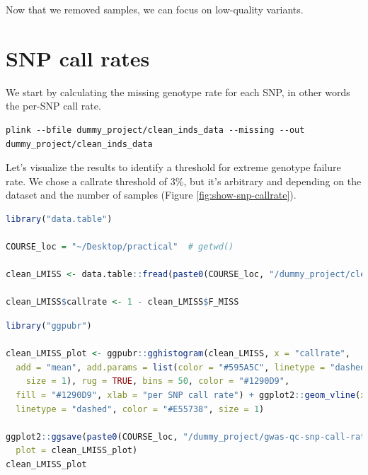 \documentclass[
]{book}
\begin{document}
Now that we removed samples, we can focus on low-quality variants.

\hypertarget{snp-call-rates}{%
\section{SNP call rates}\label{snp-call-rates}}

We start by calculating the missing genotype rate for each SNP, in other words the per-SNP call rate.

\begin{lstlisting}
plink --bfile dummy_project/clean_inds_data --missing --out dummy_project/clean_inds_data
\end{lstlisting}

Let's visualize the results to identify a threshold for extreme genotype failure rate. We chose a callrate threshold of 3\%, but it's arbitrary and depending on the dataset and the number of samples (Figure \ref{fig:show-snp-callrate}).

\begin{lstlisting}[language=R]
library("data.table")

COURSE_loc = "~/Desktop/practical"  # getwd()

clean_LMISS <- data.table::fread(paste0(COURSE_loc, "/dummy_project/clean_inds_data.lmiss"))

clean_LMISS$callrate <- 1 - clean_LMISS$F_MISS
\end{lstlisting}

\begin{lstlisting}[language=R]
library("ggpubr")

clean_LMISS_plot <- ggpubr::gghistogram(clean_LMISS, x = "callrate",
  add = "mean", add.params = list(color = "#595A5C", linetype = "dashed",
    size = 1), rug = TRUE, bins = 50, color = "#1290D9",
  fill = "#1290D9", xlab = "per SNP call rate") + ggplot2::geom_vline(xintercept = 0.95,
  linetype = "dashed", color = "#E55738", size = 1)

ggplot2::ggsave(paste0(COURSE_loc, "/dummy_project/gwas-qc-snp-call-rate.png"),
  plot = clean_LMISS_plot)
clean_LMISS_plot
\end{lstlisting}
\end{document}
